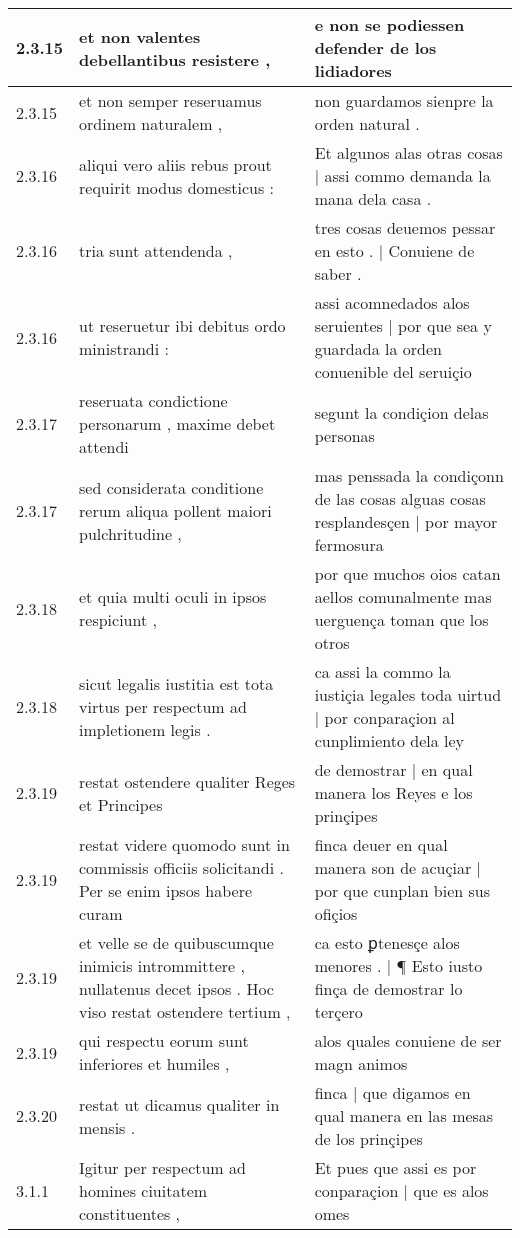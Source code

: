 \begin{tabular}{|p{1cm}|p{6.5cm}|p{6.5cm}|}
2.3.15 & et non valentes debellantibus resistere , & e non se podiessen defender de los lidiadores \\\hline
2.3.15 & et non semper reseruamus ordinem naturalem , & non guardamos sienpre la orden natural . \\\hline
2.3.16 & aliqui vero aliis rebus prout requirit modus domesticus : & Et algunos alas otras cosas | assi commo demanda la mana dela casa . \\\hline
2.3.16 & tria sunt attendenda , & tres cosas deuemos pessar en esto . | Conuiene de saber . \\\hline
2.3.16 & ut reseruetur ibi debitus ordo ministrandi : & assi acomnedados alos seruientes | por que sea y guardada la orden conuenible del seruiçio \\\hline
2.3.17 & reseruata condictione personarum , maxime debet attendi & segunt la condiçion delas personas \\\hline
2.3.17 & sed considerata conditione rerum aliqua pollent maiori pulchritudine , & mas penssada la condiçonn de las cosas alguas cosas resplandesçen | por mayor fermosura \\\hline
2.3.18 & et quia multi oculi in ipsos respiciunt , & por que muchos oios catan aellos comunalmente mas uerguença toman que los otros \\\hline
2.3.18 & sicut legalis iustitia est tota virtus per respectum ad impletionem legis . & ca assi la commo la iustiçia legales toda uirtud | por conparaçion al cunplimiento dela ley \\\hline
2.3.19 & restat ostendere qualiter Reges et Principes & de demostrar | en qual manera los Reyes e los prinçipes \\\hline
2.3.19 & restat videre quomodo sunt in commissis officiis solicitandi . Per se enim ipsos habere curam & finca deuer en qual manera son de acuçiar | por que cunplan bien sus ofiçios \\\hline
2.3.19 & et velle se de quibuscumque inimicis intrommittere , nullatenus decet ipsos . Hoc viso restat ostendere tertium , & ca esto ꝑtenesçe alos menores . | ¶ Esto iusto finça de demostrar lo terçero \\\hline
2.3.19 & qui respectu eorum sunt inferiores et humiles , & alos quales conuiene de ser magn animos \\\hline
2.3.20 & restat ut dicamus qualiter in mensis . & finca | que digamos en qual manera en las mesas de los prinçipes \\\hline
3.1.1 & Igitur per respectum ad homines ciuitatem constituentes , & Et pues que assi es por conparaçion | que es alos omes \\\hline

\end{tabular}
